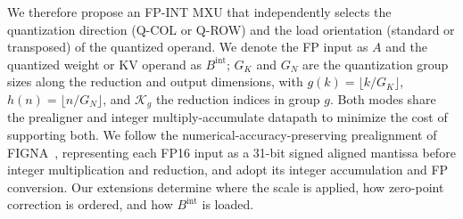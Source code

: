 \documentclass[sigconf,anonymous,nonacm]{acmart}
\newcommand{\fpint}{FP-INT}
\newcommand{\qcol}{Q-COL}
\newcommand{\qrow}{Q-ROW}
\begin{document}
We therefore propose an \fpint{} MXU that independently selects the quantization direction (\qcol{} or \qrow{}) and the load orientation (standard or transposed) of the quantized operand. We denote the FP input as $A$ and the quantized weight or KV operand as $B^{\mathrm{int}}$; $G_K$ and $G_N$ are the quantization group sizes along the reduction and output dimensions, with $g(k)=\lfloor k/G_K \rfloor$, $h(n)=\lfloor n/G_N \rfloor$, and $\mathcal{K}_g$ the reduction indices in group $g$. Both modes share the prealigner and integer multiply-accumulate datapath to minimize the cost of supporting both. We follow the numerical-accuracy-preserving prealignment of FIGNA~\cite{figna}, representing each FP16 input as a 31-bit signed aligned mantissa before integer multiplication and reduction, and adopt its integer accumulation and FP conversion. Our extensions determine where the scale is applied, how zero-point correction is ordered, and how $B^{\mathrm{int}}$ is loaded.
\end{document}
